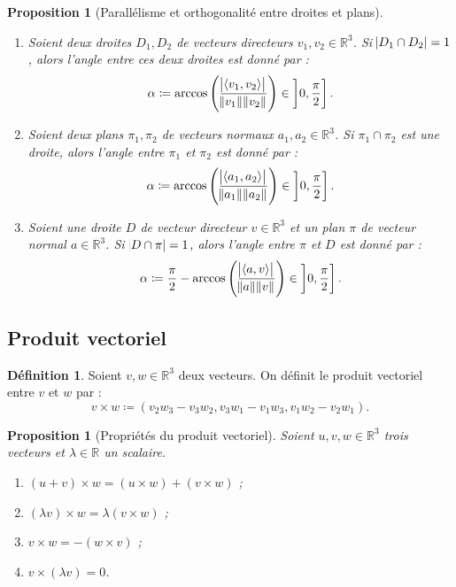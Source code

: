 \documentclass{article}
\newcommand{\R}{\mathbb R}
\newcommand{\scpr}[2]{\left\langle #1, #2\right\rangle}
\newtheorem{prp}[thm]{Proposition}
\theoremstyle{definition}
\newtheorem{déf}[thm]{Définition}
\theoremstyle{remark}
\begin{document}
		\begin{prp}[Parallélisme et orthogonalité entre droites et plans]~
		\begin{enumerate}
			\item Soient deux droites $D_1, D_2$ de vecteurs directeurs $v_1, v_2 \in \R^3$. Si $\abs{D_1 \cap D_2} = 1$, alors l'angle entre ces deux droites est donné par :
			      \[\alpha \coloneqq \arccos\left(\frac {\abs {\scpr {v_1}{v_2}}}{\norm {v_1}\norm {v_2}}\right) \in \left]0, \frac \pi2\right].\]
			\item Soient deux plans $\pi_1, \pi_2$ de vecteurs normaux $a_1, a_2 \in \R^3$. Si $\pi_1 \cap \pi_2$ est une droite, alors l'angle entre $\pi_1$ et $\pi_2$
			      est donné par : \[\alpha \coloneqq \arccos\left(\frac {\abs {\scpr {a_1}{a_2}}}{\norm {a_1}\norm {a_2}}\right) \in \left]0, \frac \pi2\right].\]
			\item Soient une droite $D$ de vecteur directeur $v \in \R^3$ et un plan $\pi$ de vecteur normal $a \in \R^3$. Si $\abs{D \cap \pi} = 1$, alors l'angle entre
			      $\pi$ et $D$ est donné par : \[\alpha \coloneqq \frac \pi2 - \arccos\left(\frac {\abs {\scpr av}}{\norm a\norm v}\right) \in \left]0, \frac \pi2\right].\]
		\end{enumerate}
		\end{prp}
	
	\subsection{Produit vectoriel}
		\begin{déf} Soient $v, w \in \R^3$ deux vecteurs. On définit le produit vectoriel entre $v$ et $w$ par :
		\[v \times w \coloneqq (v_2w_3 - v_3w_2, v_3w_1 - v_1w_3, v_1w_2 - v_2w_1).\] \end{déf}

		\begin{prp}[Propriétés du produit vectoriel] Soient $u, v, w \in \R^3$ trois vecteurs et $\lambda \in \R$ un scalaire.
		\begin{enumerate}
			\item $(u+v) \times w = (u \times w) + (v \times w)$ ;
			\item $(\lambda v) \times w = \lambda (v \times w)$ ;
			\item $v \times w = - (w \times v)$ ;
			\item $v \times (\lambda v) = 0$.
		\end{enumerate}
		\end{prp}
\end{document}

